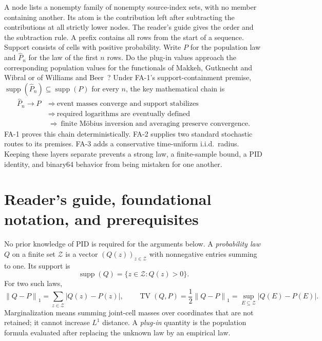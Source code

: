 \documentclass[11pt]{article}
\theoremstyle{definition}
\newcommand{\cZ}{\mathcal{Z}}
\newcommand{\supp}{\operatorname{supp}}
\newcommand{\Phat}{\widehat{P}}
\newcommand{\normone}[1]{\left\lVert #1\right\rVert_1}
\begin{document}
A node lists a nonempty family of nonempty source-index sets, with no member containing another.
Its atom is the contribution left after subtracting the contributions at all strictly lower
nodes. The reader's guide gives the order and the subtraction rule. A prefix contains
all rows from the start of a sequence.  Support consists of cells with positive probability.
Write $P$ for the population law and $\Phat_n$ for the law of the first $n$ rows.
Do the plug-in values approach the corresponding population values for the functionals of
Makkeh, Gutknecht and Wibral or of Williams and Beer~\cite{makkeh2021,williamsbeer2010}?  Under
FA-1's support-containment premise, \(\supp(\Phat_n)\subseteq\supp(P)\) for every \(n\),
the key mathematical chain is
\begin{equation}\label{eq:finite-causal-chain}
\begin{aligned}
  \Phat_n\to P
  &\ \Longrightarrow\
  \text{event masses converge and support stabilizes}\\
  &\ \Longrightarrow\
  \text{required logarithms are eventually defined}\\
  &\ \Longrightarrow\
  \text{finite M{\"o}bius inversion and averaging preserve convergence}.
\end{aligned}
\end{equation}
FA-1 proves this chain deterministically.  FA-2 supplies two standard stochastic routes to its
premises.  FA-3 adds a conservative time-uniform i.i.d.\ radius.  Keeping these layers separate
prevents a strong law, a finite-sample bound, a PID identity, and binary64 behavior from being
mistaken for one another.

\section*{\leavevmode\phantomsection Reader's guide, foundational notation, and prerequisites}

No prior knowledge of PID is required for the arguments below.  A \emph{probability law} $Q$ on a
finite set $\cZ$ is a vector $(Q(z))_{z\in\cZ}$ with nonnegative entries summing to one.  Its
support is
\[
  \supp(Q)=\{z\in\cZ:Q(z)>0\}.
\]
For two such laws,
\[
  \normone{Q-P}=\sum_{z\in\cZ}|Q(z)-P(z)|,
  \qquad
  \operatorname{TV}(Q,P)=\frac12\normone{Q-P}
  =\sup_{E\subseteq\cZ}|Q(E)-P(E)|.
\]
Marginalization means summing joint-cell masses over coordinates that are not retained; it cannot
increase $L^1$ distance.  A \emph{plug-in} quantity is the population formula evaluated after
replacing the unknown law by an empirical law.
\end{document}
